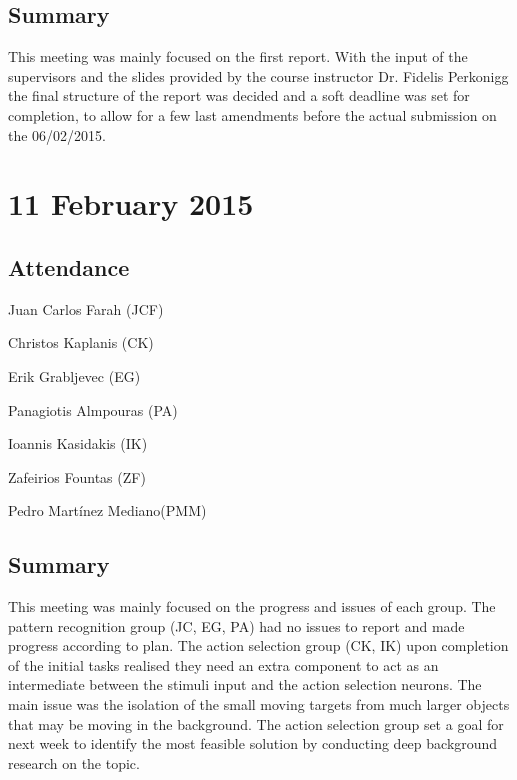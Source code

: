 \documentclass[a4paper,11pt]{article}
\begin{document}
\subsection*{Summary}
This meeting was mainly focused on the first report. With the input of the supervisors and the slides provided by the course instructor Dr. Fidelis Perkonigg the final structure of the report was decided and a soft deadline was set for completion, to allow for a few last amendments before the actual submission on the 06/02/2015.

\maketitle
\section*{11 February 2015}
\subsection*{Attendance}
\begin{compactenum}
\item Juan Carlos Farah (JCF)
\item Christos Kaplanis (CK)
\item Erik Grabljevec (EG)
\item Panagiotis Almpouras (PA)
\item Ioannis Kasidakis (IK)
\item Zafeirios Fountas (ZF)
\item Pedro Martínez Mediano(PMM)
\end{compactenum}

\subsection*{Summary}
This meeting was mainly focused on the progress and issues of each group. The pattern recognition group (JC, EG, PA) had no issues to report and made progress according to plan. The action selection group (CK, IK) upon completion of the initial tasks realised they need an extra component to act as an intermediate between the stimuli input and the action selection neurons. The main issue was the isolation of the small moving targets from much larger objects that may be moving in the background. The action selection group set a goal for next week to identify the most feasible solution by conducting deep background research on the topic.
\end{document}
